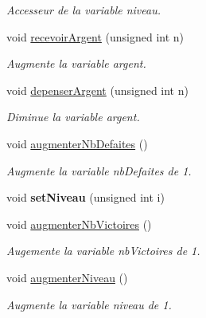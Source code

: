 \begin{DoxyCompactItemize}
\begin{DoxyCompactList}\small\item\em Accesseur de la variable niveau. \end{DoxyCompactList}\item 
void \hyperlink{class_joueur_a816878a126e2e8a4610f782b4a06f53f}{recevoir\+Argent} (unsigned int n)
\begin{DoxyCompactList}\small\item\em Augmente la variable argent. \end{DoxyCompactList}\item 
void \hyperlink{class_joueur_ae496646b2078c86011fa200b631168ca}{depenser\+Argent} (unsigned int n)
\begin{DoxyCompactList}\small\item\em Diminue la variable argent. \end{DoxyCompactList}\item 
\mbox{\label{class_joueur_a2eeebb62c0f67eabb58a4d62280675c7}} 
void \hyperlink{class_joueur_a2eeebb62c0f67eabb58a4d62280675c7}{augmenter\+Nb\+Defaites} ()
\begin{DoxyCompactList}\small\item\em Augmente la variable nb\+Defaites de 1. \end{DoxyCompactList}\item 
\mbox{\label{class_joueur_a8b3c0fa5871ae9320182090d22cfae69}} 
void {\bfseries set\+Niveau} (unsigned int i)
\item 
\mbox{\label{class_joueur_a30e0e5b06537c5a7d5853230b1da9509}} 
void \hyperlink{class_joueur_a30e0e5b06537c5a7d5853230b1da9509}{augmenter\+Nb\+Victoires} ()
\begin{DoxyCompactList}\small\item\em Augemente la variable nb\+Victoires de 1. \end{DoxyCompactList}\item 
\mbox{\label{class_joueur_afce34539fafa99280cf5976c36c1ea12}} 
void \hyperlink{class_joueur_afce34539fafa99280cf5976c36c1ea12}{augmenter\+Niveau} ()
\begin{DoxyCompactList}\small\item\em Augmente la variable niveau de 1. \end{DoxyCompactList}\item 

\end{DoxyCompactItemize}
